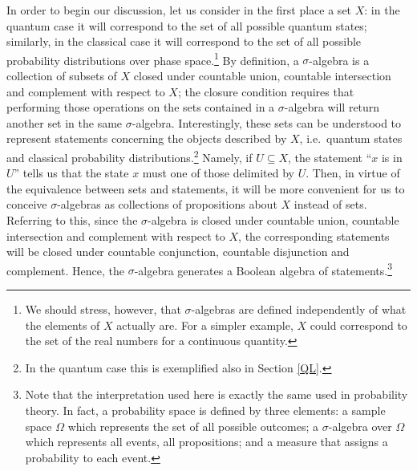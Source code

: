 \documentclass[11pt, executivepaper]{article}
\begin{document}
In order to begin our discussion, let us consider in the first place a set $X$: in the quantum case it will correspond to the set of all possible quantum states; similarly, in the classical case it will correspond to the set of all possible probability distributions over phase space.\footnote{We should stress, however, that $\sigma$-algebras are defined independently of what the elements of $X$ actually are. For a simpler example, $X$  could correspond to the set of the real numbers for a continuous quantity.} By definition, a $\sigma$-algebra is a collection of subsets of $X$ closed under countable union, countable intersection and complement with respect to $X$; the closure condition requires that  performing those operations on the sets contained in a $\sigma$-algebra will return another set in the same $\sigma$-algebra. Interestingly, these sets can be understood to represent statements concerning the objects described by $X$, i.e.\ quantum states and classical probability distributions.\footnote{In the quantum case this is exemplified also in Section \ref{QL}.} Namely, if $U \subseteq X$, the statement ``$x$ is in $U$'' tells us that the state $x$ must one of those delimited by $U$. Then, in virtue of the equivalence between sets and statements, it will be more convenient for us to conceive $\sigma$-algebras as collections of propositions about $X$ instead of sets. Referring to this, since the $\sigma$-algebra is closed under countable union, countable intersection and complement with respect to $X$, the corresponding statements will be closed under countable conjunction, countable disjunction and complement. Hence, the $\sigma$-algebra generates a Boolean algebra of statements.\footnote{Note that the interpretation used here is exactly the same used in probability theory. In fact, a probability space is defined by three elements: a sample space $\Omega$ which represents the set of all possible outcomes; a $\sigma$-algebra over $\Omega$ which represents all events, all propositions; and a measure that assigns a probability to each event.} 
\end{document}
